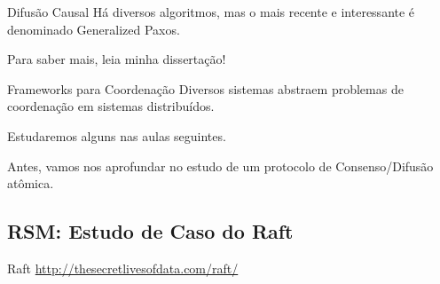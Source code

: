 \begin{frame}{Difusão Causal}
Há diversos algoritmos, mas o mais recente e interessante é denominado Generalized Paxos.

Para saber mais, leia minha dissertação!
\end{frame}

\begin{frame}{Frameworks para Coordenação}
Diversos sistemas abstraem problemas de coordenação em sistemas distribuídos.

Estudaremos alguns nas aulas seguintes.
\end{frame}

Antes, vamos nos aprofundar no estudo de um protocolo de Consenso/Difusão atômica.

\subsection{RSM: Estudo de Caso do Raft}
\begin{frame}{Raft}
\url{http://thesecretlivesofdata.com/raft/}
\end{frame}






